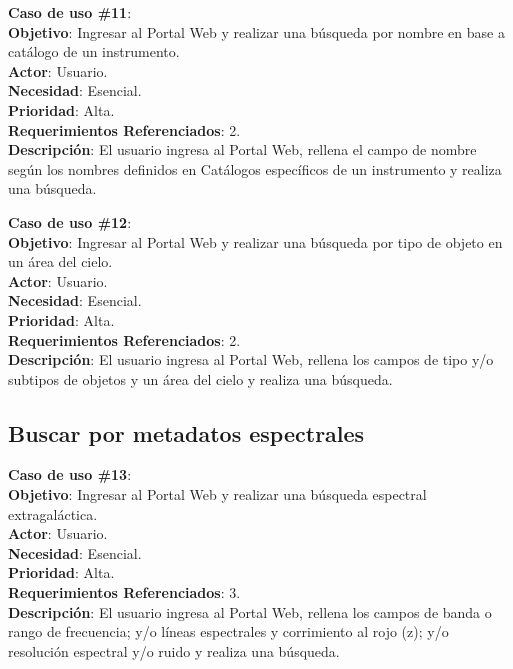 \noindent\textbf{Caso de uso \#11}: \\
\textbf{Objetivo}: Ingresar al Portal Web y realizar una búsqueda por nombre en base a catálogo de un instrumento. \\
\textbf{Actor}: Usuario.\\
\textbf{Necesidad}: Esencial.\\
\textbf{Prioridad}: Alta.\\
\textbf{Requerimientos Referenciados}: 2. \\
\textbf{Descripción}: El usuario ingresa al Portal Web, rellena el campo de nombre según los nombres definidos en Catálogos específicos de un instrumento y realiza una búsqueda.
\vspace{1.0cm}

\noindent\textbf{Caso de uso \#12}: \\
\textbf{Objetivo}: Ingresar al Portal Web y realizar una búsqueda por tipo de objeto en un área del cielo. \\
\textbf{Actor}: Usuario.\\
\textbf{Necesidad}: Esencial.\\
\textbf{Prioridad}: Alta.\\
\textbf{Requerimientos Referenciados}: 2. \\
\textbf{Descripción}: El usuario ingresa al Portal Web, rellena los campos de tipo y/o subtipos de objetos y un área del cielo y realiza una búsqueda.
\vspace{1.0cm}

\subsection{Buscar por metadatos espectrales}
\noindent\textbf{Caso de uso \#13}: \\
\textbf{Objetivo}: Ingresar al Portal Web y realizar una búsqueda espectral extragaláctica. \\
\textbf{Actor}: Usuario.\\
\textbf{Necesidad}: Esencial.\\
\textbf{Prioridad}: Alta.\\
\textbf{Requerimientos Referenciados}: 3. \\
\textbf{Descripción}: El usuario ingresa al Portal Web, rellena los campos de banda o rango de frecuencia;  y/o líneas espectrales y corrimiento al rojo (z); y/o resolución espectral y/o ruido y realiza una búsqueda.
\vspace{1.0cm}

